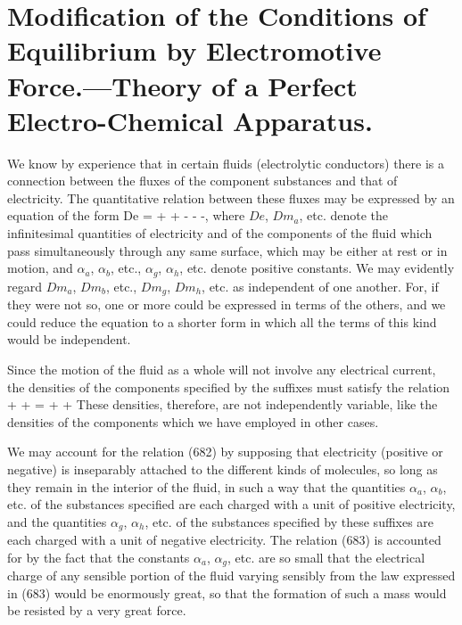 \documentclass[12pt]{article}
\begin{document}
\section{Modification of the Conditions of Equilibrium  by Electromotive Force.---Theory of a Perfect Electro-Chemical Apparatus.}
We know by experience that in certain fluids (electrolytic conductors) there is a connection between the fluxes of the component substances and that of electricity. The quantitative relation between these fluxes may be expressed by an equation of the form
\eqs De = +  + -  -  -,    \label{682} \eqe
where $De$, $Dm_a$, etc. denote the infinitesimal quantities of electricity and of the components of the fluid which pass simultaneously through any same surface, which may be either at rest or in motion, and $\alpha_a$, $\alpha_b$, etc., $\alpha_g$, $\alpha_h$, etc. denote positive constants. We may evidently regard $Dm_a$, $Dm_b$, etc., $Dm_g$, $Dm_h$, etc. as independent of one another. For, if they were not so, one or more could be expressed in terms of the others, and we could reduce the equation to a shorter form in which all the terms of this kind would be independent.

Since the motion of the fluid as a whole will not involve any electrical current, the densities of the components specified by the suffixes must satisfy the relation
\eqs {} + +  =  + +     \label{683} \eqe
These densities, therefore, are not independently variable, like the densities of the components which we have employed in other cases.

We may account for the relation (682) by supposing that electricity (positive or negative) is inseparably attached to the different kinds of molecules, so long as they remain in the interior of the fluid, in such a way that the quantities $\alpha_a$, $\alpha_b$, etc. of the substances specified are each charged with a unit of positive electricity, and the quantities $\alpha_g$, $\alpha_h$, etc. of the substances specified by these suffixes are each charged with a unit of negative electricity. The relation (683) is accounted for by the fact that the constants $\alpha_a$, $\alpha_g$, etc. are so small that the electrical charge of any sensible portion of the fluid varying sensibly from the law  expressed in (683) would be enormously great, so that the formation of such a mass would be resisted by a very great force.
\end{document}
